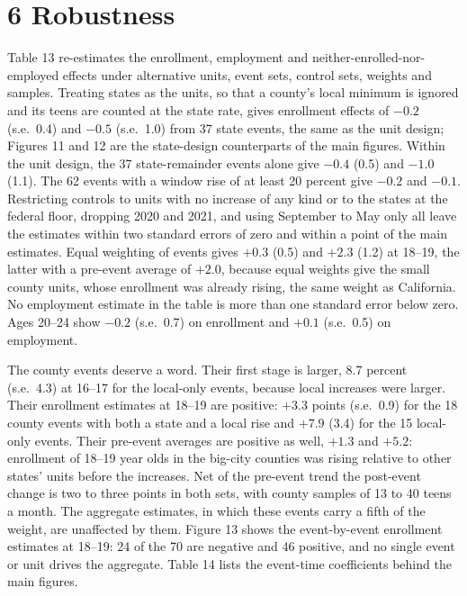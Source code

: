 \documentclass[12pt]{article}
\begin{document}
\section{6 Robustness}

Table 13 re-estimates the enrollment, employment and neither-enrolled-nor-employed effects under alternative units, event sets, control sets, weights and samples. Treating states as the units, so that a county's local minimum is ignored and its teens are counted at the state rate, gives enrollment effects of $-0.2$ (s.e.\ 0.4) and $-0.5$ (s.e.\ 1.0) from 37 state events, the same as the unit design; Figures 11 and 12 are the state-design counterparts of the main figures. Within the unit design, the 37 state-remainder events alone give $-0.4$ (0.5) and $-1.0$ (1.1). The 62 events with a window rise of at least 20 percent give $-0.2$ and $-0.1$. Restricting controls to units with no increase of any kind or to the states at the federal floor, dropping 2020 and 2021, and using September to May only all leave the estimates within two standard errors of zero and within a point of the main estimates. Equal weighting of events gives $+0.3$ (0.5) and $+2.3$ (1.2) at 18--19, the latter with a pre-event average of $+2.0$, because equal weights give the small county units, whose enrollment was already rising, the same weight as California. No employment estimate in the table is more than one standard error below zero. Ages 20--24 show $-0.2$ (s.e.\ 0.7) on enrollment and $+0.1$ (s.e.\ 0.5) on employment.

The county events deserve a word. Their first stage is larger, 8.7 percent (s.e.\ 4.3) at 16--17 for the local-only events, because local increases were larger. Their enrollment estimates at 18--19 are positive: $+3.3$ points (s.e.\ 0.9) for the 18 county events with both a state and a local rise and $+7.9$ (3.4) for the 15 local-only events. Their pre-event averages are positive as well, $+1.3$ and $+5.2$: enrollment of 18--19 year olds in the big-city counties was rising relative to other states' units before the increases. Net of the pre-event trend the post-event change is two to three points in both sets, with county samples of 13 to 40 teens a month. The aggregate estimates, in which these events carry a fifth of the weight, are unaffected by them. Figure 13 shows the event-by-event enrollment estimates at 18--19: 24 of the 70 are negative and 46 positive, and no single event or unit drives the aggregate. Table 14 lists the event-time coefficients behind the main figures.
\end{document}
